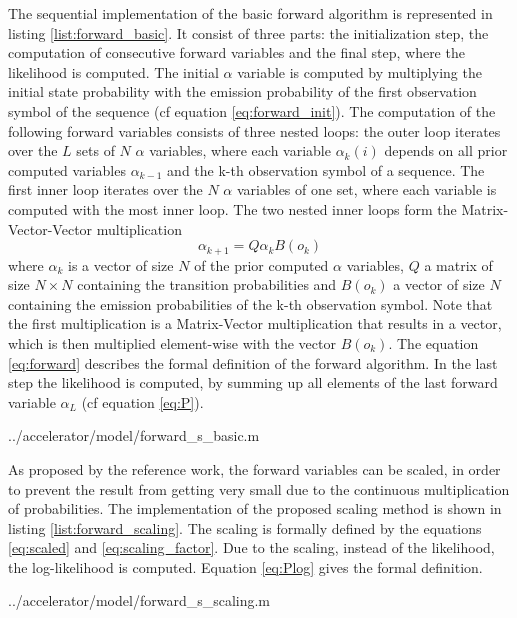 \documentclass[mscthesis]{usiinfthesis}
\begin{document}
The sequential implementation of the basic forward algorithm is represented in
listing \ref{list:forward_basic}. It consist of three parts: the initialization
step, the computation of consecutive forward variables and the final step,
where the likelihood is computed. The initial $ \alpha $ variable is computed
by multiplying the initial state probability with the emission probability of
the first observation symbol of the sequence (cf equation
\ref{eq:forward_init}). The computation of the following forward variables
consists of three nested loops: the outer loop iterates over the $ L $ sets of
$ N $ $ \alpha $ variables, where each variable $\alpha_k(i)$ depends on all
prior computed variables $\alpha_{k-1}$ and the k-th observation symbol of
a sequence. The first inner loop iterates over the $ N $ $ \alpha $ variables
of one set, where each variable is computed with the most inner loop. The two
nested inner loops form the Matrix-Vector-Vector multiplication
\begin{equation}
    \label{eq:mvv}
    \alpha_{k+1} = Q \alpha_k B(o_k)
\end{equation}
where $ \alpha_k $ is a vector of size $ N $ of the prior computed $ \alpha
$ variables, $ Q $ a matrix of size $ N \times N $ containing the transition
probabilities and $ B(o_k) $ a vector of size $ N $ containing the emission
probabilities of the k-th observation symbol. Note that the first
multiplication is a Matrix-Vector multiplication that results in a vector,
which is then multiplied element-wise with the vector $ B(o_k) $. The equation
\ref{eq:forward} describes the formal definition of the forward algorithm. In
the last step the likelihood is computed, by summing up all elements of the
last forward variable $ \alpha_L $ (cf equation \ref{eq:P}).


    {../accelerator/model/forward_s_basic.m}

As proposed by the reference work, the forward variables can be scaled, in
order to prevent the result from getting very small due to the continuous
multiplication of probabilities. The implementation of the proposed scaling
method is shown in listing \ref{list:forward_scaling}. The scaling is formally
defined by the equations \ref{eq:scaled} and \ref{eq:scaling_factor}. Due to the
scaling, instead of the likelihood, the log-likelihood is computed. Equation
\ref{eq:Plog} gives the formal definition.


    {../accelerator/model/forward_s_scaling.m}
\end{document}
